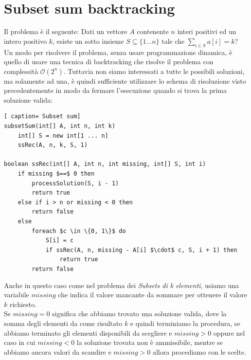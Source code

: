 \documentclass[../cheatSheetAlgoritmi.tex]{subfiles}
\begin{document}
\section{Subset sum backtracking}
Il problema è il seguente: Dati un vettore $A$ contenente $n$ interi positivi ed un intero positivo $k$, esiste un sotto insieme $S \subseteq \{1. . . n\}$ tale che $\sum_{i \in S} a[i] = k$? \\
Un modo per risolvere il problema, senza usare programmazione dinamica, è quello di usare una tecnica di backtracking che risolve il problema con complessità $\mathcal{O}(2^n)$. Tuttavia non siamo interessati a tutte le possibili soluzioni, ma solamente ad una, è quindi sufficiente utilizzare lo schema di risoluzione visto precedentemente in modo da fermare l'esecuzione quando si trova la prima soluzione valida:
 \begin{lstlisting}[ caption= Subset sum]
subsetSum(int[] A, int n, int k)
	int[] S = new int[1 ... n]
	ssRec(A, n, k, S, 1)

boolean ssRec(int[] A, int n, int missing, int[] S, int i)
	if missing $==$ 0 then
		processSolution(S, i - 1)
		return true
	else if i > n or missing < 0 then
		return false
	else 
		foreach $c \in \{0, 1\}$ do
			S[i] = c
			if ssRec(A, n, missing - A[i] $\cdot$ c, S, i + 1) then
				return true
		return false
\end{lstlisting}
Anche in questo caso come nel problema dei \emph{Subsets di k elementi}, usiamo una variabile $missing$ che indica il valore mancante da sommare per ottenere il valore $k$ richiesto. \\
Se $missing = 0$ significa che abbiamo trovato una soluzione valida, dove la somma degli elementi da come risultato $k$ e quindi terminiamo la procedura, se abbiamo terminato gli elementi disponibili da scegliere e $missing > 0$ oppure nel caso in cui $missing < 0$ la soluzione trovata non è ammissibile, mentre se abbiamo ancora valori da scandire e $missing > 0$ allora procediamo con le scelte.
\end{document}
